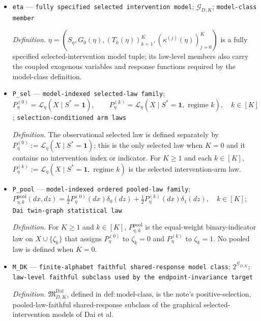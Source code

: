 \documentclass{article}
\begin{document}
\begin{itemize}
  \item \texttt{eta} --- \texttt{fully specified selected intervention model}; \(\mathcal G_{D,K}\); \texttt{model-\allowbreak{}class member}
  \par\smallskip\noindent\emph{Definition.} \(\eta=(S_\eta,G_0(\eta),(T_k(\eta))_{k=1}^{K},(\kappa^{(j)}(\eta))_{j=0}^{K})\) is a fully specified selected-intervention model tuple; its law-level members also carry the coupled exogenous variables and response functions required by the model-class definition.
  \item \texttt{P\_\allowbreak{}sel} --- \texttt{model-\allowbreak{}indexed selected-\allowbreak{}law family}; \(P_{\eta}^{(0)}=\mathcal L_{\eta}(X\mid S^*=\mathbf 1),\qquad P_{\eta}^{(k)}=\mathcal L_{\eta}(X\mid S^*=\mathbf 1,\text{ regime }k),\quad k\in[K]\); \texttt{selection-\allowbreak{}conditioned arm laws}
  \par\smallskip\noindent\emph{Definition.} The observational selected law is defined separately by \(P_{\eta}^{(0)}:=\mathcal L_{\eta}(X\mid S^*=\mathbf 1)\); this is the only selected law when \(K=0\) and it contains no intervention index or indicator. For \(K\ge 1\) and each \(k\in[K]\), \(P_{\eta}^{(k)}:=\mathcal L_{\eta}(X\mid S^*=\mathbf 1,\text{ regime }k)\) is the selected intervention-arm law.
  \item \texttt{P\_\allowbreak{}pool} --- \texttt{model-\allowbreak{}indexed ordered pooled-\allowbreak{}law family}; \(P_{\eta,k}^{\mathrm{pool}}(dx,dz)=\tfrac12P_{\eta}^{(0)}(dx)\delta_0(dz)+\tfrac12P_{\eta}^{(k)}(dx)\delta_1(dz),\quad k\in[K]\); \texttt{Dai twin-\allowbreak{}graph statistical law}
  \par\smallskip\noindent\emph{Definition.} For \(K\ge 1\) and \(k\in[K]\), \(P_{\eta,k}^{\mathrm{pool}}\) is the equal-weight binary-indicator law on \(X\cup\{\zeta_k\}\) that assigns \(P_{\eta}^{(0)}\) to \(\zeta_k=0\) and \(P_{\eta}^{(k)}\) to \(\zeta_k=1\). No pooled law is defined when \(K=0\).
  \item \texttt{M\_\allowbreak{}DK} --- \texttt{finite-\allowbreak{}alphabet faithful shared-\allowbreak{}response model class}; \(2^{\mathcal G_{D,K}}\); \texttt{law-\allowbreak{}level faithful subclass used by the endpoint-\allowbreak{}invariance target}
  \par\smallskip\noindent\emph{Definition.} \(\mathfrak M_{D,K}^{\mathrm{Dai}}\), defined in \(\mathrm{def:model\mbox{-}class}\), is the note's positive-selection, pooled-law-faithful shared-response subclass of the graphical selected-intervention models of Dai et al.

\end{itemize}
\end{document}
